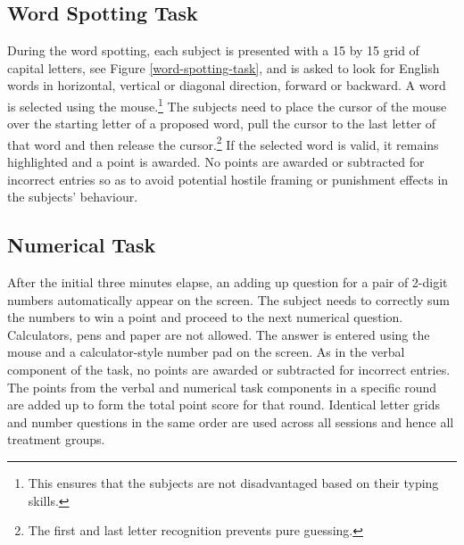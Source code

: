 \documentclass[a4paper,11pt,oneside]{article}
\begin{document}
\subsection{Word Spotting Task}

During the word spotting, each subject is presented with a 15 by 15 grid of capital letters, see Figure \autoref{word-spotting-task}, and is asked to look for English words in horizontal, vertical or diagonal direction, forward or backward. A word is selected using the mouse.\footnote{This ensures that the subjects are not disadvantaged based on their typing skills.} The subjects need to place the cursor of the mouse over the starting letter of a proposed word, pull the cursor to the last letter of that word and then release the cursor.\footnote{The first and last letter recognition prevents pure guessing.} If the selected word is valid, it remains highlighted and a point is awarded. No points are awarded or subtracted for incorrect entries so as to avoid potential hostile framing or punishment effects in the subjects' behaviour.


\subsection{Numerical Task}
After the initial three minutes elapse, an adding up question for a pair of 2-digit numbers automatically appear on the screen. The subject needs to correctly sum the numbers to win a point and proceed to the next numerical question. Calculators, pens and paper are not allowed. The answer is entered using the mouse and a calculator-style number pad on the screen. As in
the verbal component of the task, no points are awarded or subtracted for incorrect entries. The points from the verbal and numerical task components in a specific round are added up to form the total point score for that round. Identical letter grids and number questions in the same order are used across all sessions and hence all treatment groups.
\end{document}
